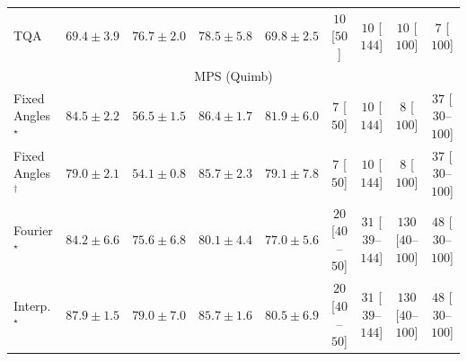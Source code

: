 \begin{tabular}{l|cccc|cccc|}
TQA & {\cellcolor[HTML]{99B2D5}} \color[HTML]{000000} $69.4\pm 3.9$ & {\cellcolor[HTML]{8C72B5}} \color[HTML]{F1F1F1} $76.7\pm 2.0$ & {\cellcolor[HTML]{8B62AD}} \color[HTML]{F1F1F1} $78.5\pm 5.8$ & {\cellcolor[HTML]{98AED3}} \color[HTML]{000000} $69.8\pm 2.5$ & {\cellcolor[HTML]{FFF7F3}} \color[HTML]{000000} $10$ [$50$] & {\cellcolor[HTML]{FFF7F3}} \color[HTML]{000000} $10$ [$144$] & {\cellcolor[HTML]{FFF7F3}} \color[HTML]{000000} $10$ [$100$] & {\cellcolor[HTML]{FFF7F3}} \color[HTML]{000000} $7$ [$100$] \\
\cline{1-9}
\multicolumn{9}{c}{\rule{0pt}{8pt}MPS (Quimb)} \\
\midrule
Fixed Angles$^\star$ & {\cellcolor[HTML]{B34003}} \color[HTML]{F1F1F1} $84.5\pm 2.2$ & {\cellcolor[HTML]{FFFBD0}} \color[HTML]{000000} $56.5\pm 1.5$ & {\cellcolor[HTML]{9E3604}} \color[HTML]{F1F1F1} $86.4\pm 1.7$ & {\cellcolor[HTML]{CE4F03}} \color[HTML]{F1F1F1} $81.9\pm 6.0$ & {\cellcolor[HTML]{FFF7F3}} \color[HTML]{000000} $7$ [$50$] & {\cellcolor[HTML]{FFF7F3}} \color[HTML]{000000} $10$ [$144$] & {\cellcolor[HTML]{FFF7F3}} \color[HTML]{000000} $8$ [$100$] & {\cellcolor[HTML]{FEF1ED}} \color[HTML]{000000} $37$ [$30$--$100$] \\
Fixed Angles$^\dagger$ & {\cellcolor[HTML]{E2650F}} \color[HTML]{F1F1F1} $79.0\pm 2.1$ & {\cellcolor[HTML]{FFFFE5}} \color[HTML]{000000} $54.1\pm 0.8$ & {\cellcolor[HTML]{A63A03}} \color[HTML]{F1F1F1} $85.7\pm 2.3$ & {\cellcolor[HTML]{E1640E}} \color[HTML]{F1F1F1} $79.1\pm 7.8$ & {\cellcolor[HTML]{FFF7F3}} \color[HTML]{000000} $7$ [$50$] & {\cellcolor[HTML]{FFF7F3}} \color[HTML]{000000} $10$ [$144$] & {\cellcolor[HTML]{FFF7F3}} \color[HTML]{000000} $8$ [$100$] & {\cellcolor[HTML]{FEF1ED}} \color[HTML]{000000} $37$ [$30$--$100$] \\
Fourier$^\star$ & {\cellcolor[HTML]{B64203}} \color[HTML]{F1F1F1} $84.2\pm 6.6$ & {\cellcolor[HTML]{F4811D}} \color[HTML]{F1F1F1} $75.6\pm 6.8$ & {\cellcolor[HTML]{DA5C0A}} \color[HTML]{F1F1F1} $80.1\pm 4.4$ & {\cellcolor[HTML]{EE7416}} \color[HTML]{F1F1F1} $77.0\pm 5.6$ & {\cellcolor[HTML]{FFF4F0}} \color[HTML]{000000} $20$ [$40$--$50$] & {\cellcolor[HTML]{FFF2EE}} \color[HTML]{000000} $31$ [$39$--$144$] & {\cellcolor[HTML]{FDDBD7}} \color[HTML]{000000} $130$ [$40$--$100$] & {\cellcolor[HTML]{FEEEEB}} \color[HTML]{000000} $48$ [$30$--$100$] \\
Interp.$^\star$ & {\cellcolor[HTML]{8E3104}} \color[HTML]{F1F1F1} $87.9\pm 1.5$ & {\cellcolor[HTML]{E2650F}} \color[HTML]{F1F1F1} $79.0\pm 7.0$ & {\cellcolor[HTML]{A63A03}} \color[HTML]{F1F1F1} $85.7\pm 1.6$ & {\cellcolor[HTML]{D75908}} \color[HTML]{F1F1F1} $80.5\pm 6.9$ & {\cellcolor[HTML]{FFF4F0}} \color[HTML]{000000} $20$ [$40$--$50$] & {\cellcolor[HTML]{FFF2EE}} \color[HTML]{000000} $31$ [$39$--$144$] & {\cellcolor[HTML]{FDDBD7}} \color[HTML]{000000} $130$ [$40$--$100$] & {\cellcolor[HTML]{FEEEEB}} \color[HTML]{000000} $48$ [$30$--$100$] \\

\end{tabular}
